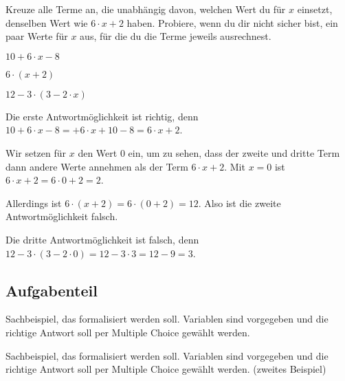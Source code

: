 \documentclass[solution]{uebungsblatt}
\begin{document}
\begin{exercise}
    Kreuze alle Terme an, die unabhängig davon, welchen Wert du für $x$ einsetzt, denselben Wert wie $6\cdot x+2$ haben. Probiere, wenn du dir nicht sicher bist, ein paar Werte für $x$ aus, für die du die Terme jeweils ausrechnest.
    \begin{multicols}{3}
        \begin{multiplechoice}
            \citem $10+6\cdot x-8$
            \item $6\cdot (x+2)$
            \item $12-3\cdot (3-2\cdot x)$
        \end{multiplechoice}
    \end{multicols}
    \begin{answerbox}[1.2in]
        Die erste Antwortmöglichkeit ist richtig, denn $10+6\cdot x-8=+6\cdot x+10-8=6\cdot x+2$.

        Wir setzen für $x$ den Wert $0$ ein, um zu sehen, dass der zweite und dritte Term dann andere Werte annehmen als der Term $6\cdot x+2$. Mit $x=0$ ist $6\cdot x+2=6\cdot 0+2=2$.
        
        Allerdings ist $6\cdot (x+2)=6\cdot (0+2)=12$. Also ist die zweite Antwortmöglichkeit falsch.

        Die dritte Antwortmöglichkeit ist falsch, denn $12-3\cdot (3-2\cdot 0)=12-3\cdot 3=12-9=3$.
    \end{answerbox}
\end{exercise}


\subsection*{Aufgabenteil}

\begin{exercise}
    Sachbeispiel, das formalisiert werden soll. Variablen sind vorgegeben und die richtige Antwort soll per Multiple Choice gewählt werden.
\end{exercise}
\begin{exercise}
    Sachbeispiel, das formalisiert werden soll. Variablen sind vorgegeben und die richtige Antwort soll per Multiple Choice gewählt werden. (zweites Beispiel)
\end{exercise}

\end{document}
